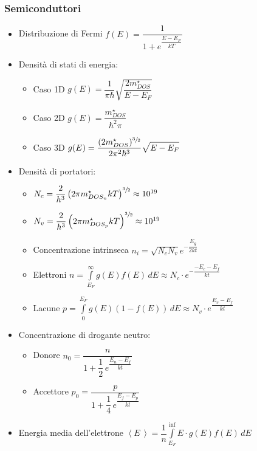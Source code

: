 \documentclass{article}
\begin{document}
\subsubsection{Semiconduttori}
\begin{itemize}
  \item Distribuzione di Fermi \( f(E) = \dfrac{1}{1+e^{\dfrac{E-E_F}{kT}}} \)
  \item Densità di stati di energia:
        \begin{itemize}
          \item Caso 1D \( \displaystyle g(E) = \dfrac{1}{\pi \hbar} \sqrt{\dfrac{2 m_{DOS}^\star}{E-E_F}} \)
          \item Caso 2D \( g(E) = \dfrac{m_{DOS}^\star}{\hbar^ 2 \pi} \)
          \item Caso 3D \( \displaystyle g(E) = \dfrac{(2 m_{DOS}^\star) ^ {\sfrac{3}{2}}}{2 \pi^2 \hbar^3} \sqrt{E-E_F} \)
        \end{itemize}
  \item Densità di portatori:
        \begin{itemize}
          \item  \( N_c = \dfrac{2}{h ^ 3} \left(2 \pi m^{\star}_{DOS_n} k T \right) ^ {\sfrac{3}{2}} \approx 10 ^ {19} \)
          \item \( N_v = \dfrac{2}{h ^ 3} \left(2 \pi m^{\star}_{DOS_p} k T \right) ^ {\sfrac{3}{2}} \approx 10 ^ {19} \)
          \item Concentrazione intrinseca \( \displaystyle n_i = \sqrt{N_c  N_v} e ^ {-\dfrac{E_{g}}{2kt}} \)
          \item Elettroni \( \displaystyle n = \int\limits_{E_F}^{\infty} g(E) f(E) \, dE \approx N_c \cdot e ^ {-\dfrac{-E_c - E_f}{kt}} \)
          \item Lacune \( \displaystyle p = \int\limits_{0}^{E_F} g(E) \left( 1- f(E) \right) \, dE \approx N_v \cdot e ^ {\dfrac{E_v - E_f}{kt}} \)
        \end{itemize}
  \item Concentrazione di drogante neutro:
        \begin{itemize}
          \item Donore \( n_0 = \dfrac{n}{1 + \dfrac{1}{2} \, e^{\dfrac{E_n-E_f}{kt}}} \)
          \item Accettore \( p_0 = \dfrac{p}{1 + \dfrac{1}{4} \, e^{\dfrac{E_f-E_p}{kt}}} \)
        \end{itemize}
  \item Energia media dell'elettrone \( \displaystyle \left<E\,\right> = \dfrac{1}{n} \int\limits_{E_F}^{\inf} E \cdot g(E) f(E) \, dE \)

\end{itemize}
\end{document}
